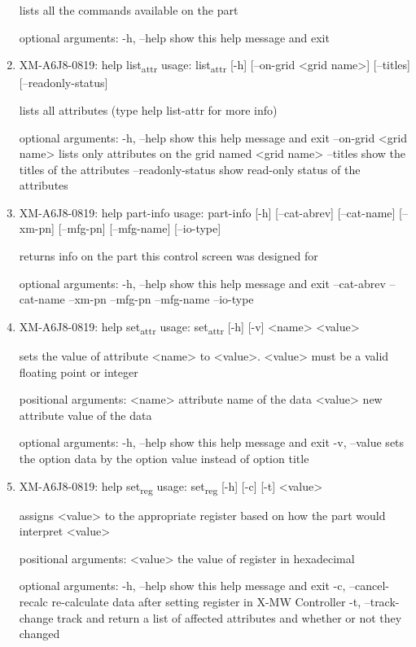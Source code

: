 \documentclass[11pt]{article}
\begin{document}
\begin{enumerate}
lists all the commands available on the part

optional arguments:
  -h, --help  show this help message and exit

\item XM-A6J8-0819: help list\textsubscript{attr}
\label{sec:orgdb4a696}
usage: list\textsubscript{attr} [-h] [--on-grid <grid name>] [--titles] [--readonly-status]

lists all attributes (type help list-attr for more info)

optional arguments:
  -h, --help            show this help message and exit
  --on-grid <grid name>
                        lists only attributes on the grid named <grid name>
  --titles              show the titles of the attributes
  --readonly-status     show read-only status of the attributes

\item XM-A6J8-0819: help part-info
\label{sec:orge770c89}
usage: part-info  [-h] [--cat-abrev] [--cat-name] [--xm-pn] [--mfg-pn] [--mfg-name]
        [--io-type]

returns info on the part this control screen was designed for

optional arguments:
  -h, --help   show this help message and exit
  --cat-abrev
  --cat-name
  --xm-pn
  --mfg-pn
  --mfg-name
  --io-type

\item XM-A6J8-0819: help set\textsubscript{attr}
\label{sec:orgc13a84b}
usage: set\textsubscript{attr} [-h] [-v] <name> <value>

sets the value of attribute <name> to <value>. <value> must be a valid
floating point or integer

positional arguments:
  <name>       attribute name of the data
  <value>      new attribute value of the data

optional arguments:
  -h, --help   show this help message and exit
  -v, --value  sets the option data by the option value instead of option
               title

\item XM-A6J8-0819: help set\textsubscript{reg}
\label{sec:org0a6577f}
usage: set\textsubscript{reg} [-h] [-c] [-t] <value>

assigns <value> to the appropriate register based on how the part would
interpret <value>

positional arguments:
  <value>              the value of register in hexadecimal

optional arguments:
  -h, --help           show this help message and exit
  -c, --cancel-recalc  re-calculate data after setting register in X-MW
                       Controller
  -t, --track-change   track and return a list of affected attributes and
                       whether or not they changed


\end{enumerate}
\end{document}
